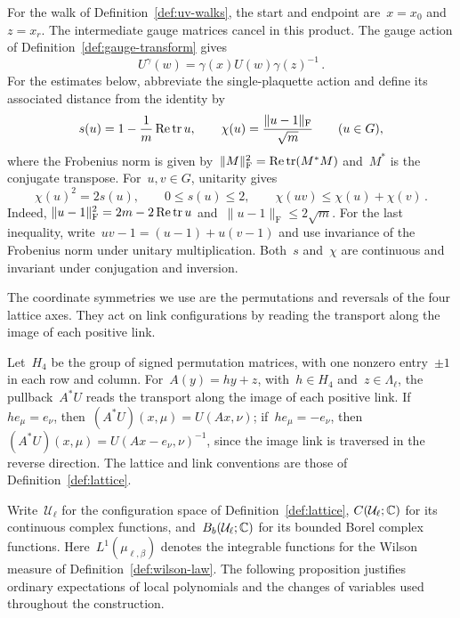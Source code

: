 For the walk of Definition~\ref{def:uv-walks}, the start and endpoint are~$x=x_0$ and~$z=x_r$. The intermediate gauge matrices cancel in this product.
The gauge action of Definition~\ref{def:gauge-transform} gives
\begin{equation}\label{eq:uv-gauge}
 U^\gamma(w)=\gamma(x)U(w)\gamma(z)^{-1}\,.
\end{equation}
For the estimates below, abbreviate the single-plaquette action and define its associated distance from the identity by
\begin{equation}\label{eq:uv-chord}
 s(u)=1-\frac{1}{m}\operatorname{Re}\operatorname{tr} u,
 \qquad \chi(u)=\frac{\|u-1\|_{\mathrm F}}{\sqrt m}\qquad(u\in G),
\end{equation}
where the Frobenius norm is given by~$\|M\|_{\mathrm F}^2=\operatorname{Re}\operatorname{tr}(M^*M)$ and~$M^*$ is the conjugate transpose.
For~$u,v\in G$, unitarity gives
\begin{equation}\label{eq:uv-chord-square}
 \chi(u)^2=2s(u),\qquad 0\le s(u)\le2,\qquad
 \chi(uv)\le\chi(u)+\chi(v)\,.
\end{equation}
Indeed, $\|u-1\|_{\mathrm F}^2=2m-2\operatorname{Re}\operatorname{tr} u$ and~$\|u-1\|_{\mathrm F}\le2\sqrt m$.
For the last inequality, write~$uv-1=(u-1)+u(v-1)$ and use invariance of the Frobenius norm under unitary multiplication.
Both~$s$ and~$\chi$ are continuous and invariant under conjugation and inversion.

The coordinate symmetries we use are the permutations and reversals of the four lattice axes.
They act on link configurations by reading the transport along the image of each positive link.

\begin{definition}\label{def:uv-symmetries}
Let~$H_4$ be the group of signed permutation matrices, with one nonzero entry~$\pm1$ in each row and column.
For~$A(y)=hy+z$, with~$h\in H_4$ and~$z\in\Lambda_\ell$, the pullback~$A^*U$ reads the transport along the image of each positive link.
If~$he_\mu=e_\nu$, then~$(A^*U)(x,\mu)=U(Ax,\nu)$; if~$he_\mu=-e_\nu$, then~$(A^*U)(x,\mu)=U(Ax-e_\nu,\nu)^{-1}$, since the image link is traversed in the reverse direction.
The lattice and link conventions are those of Definition~\ref{def:lattice}.
\end{definition}

Write~$\mathcal U_\ell$ for the configuration space of Definition~\ref{def:lattice}, $C(\mathcal U_\ell;\mathbb C)$ for its continuous complex functions, and~$B_b(\mathcal U_\ell;\mathbb C)$ for its bounded Borel complex functions.
Here~$L^1(\mu_{\ell,\beta})$ denotes the integrable functions for the Wilson measure of Definition~\ref{def:wilson-law}.
The following proposition justifies ordinary expectations of local polynomials and the changes of variables used throughout the construction.

